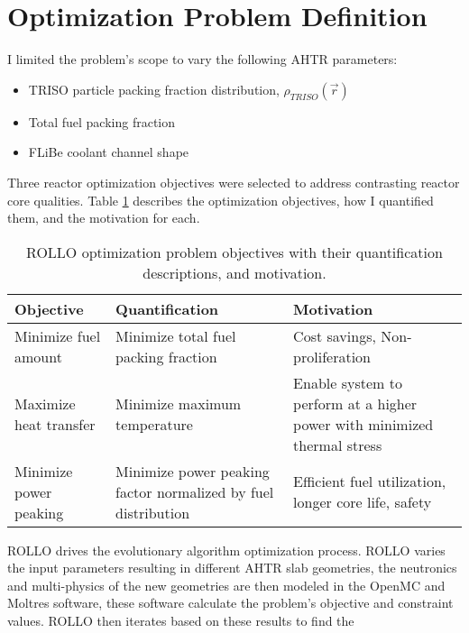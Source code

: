 \section{Optimization Problem Definition}
I limited the problem's scope to vary the following \gls{AHTR} parameters: 
\begin{itemize}
    \item \gls{TRISO} particle packing fraction distribution, $\rho_{TRISO}(\vec{r})$
    \item Total fuel packing fraction
    \item \gls{FLiBe} coolant channel shape 
\end{itemize} 
Three reactor optimization objectives were selected to address contrasting 
reactor core qualities. 
Table \ref{tab:objectives} describes the optimization objectives, how I quantified 
them, and the motivation for each.
\begin{table}[H]
    \centering
    \onehalfspacing
    \caption{\acrfull{ROLLO} optimization problem objectives with their quantification 
    descriptions, and motivation.}
	\label{tab:objectives}
    \footnotesize
    \begin{tabular}{p{4cm}p{5cm}p{5cm}}
    \hline 
    \textbf{Objective}& \textbf{Quantification}& \textbf{Motivation} \\
    \hline
    Minimize fuel amount & Minimize total fuel packing fraction & Cost savings, Non-proliferation \\ 
    \hline
    Maximize heat transfer & Minimize maximum temperature & Enable system to perform at a higher power with minimized thermal stress \\
    \hline
    Minimize power peaking & Minimize power peaking factor normalized by fuel distribution & Efficient fuel utilization, longer core life, safety\\
    \hline
    \end{tabular}
\end{table}
\gls{ROLLO} drives the evolutionary algorithm optimization process. 
\gls{ROLLO} varies the input parameters resulting in different AHTR slab geometries, 
the neutronics and multi-physics of the new geometries are then modeled in the 
OpenMC and Moltres software, these software calculate the problem's objective 
and constraint values. 
\gls{ROLLO} then iterates based on these results to find the 
